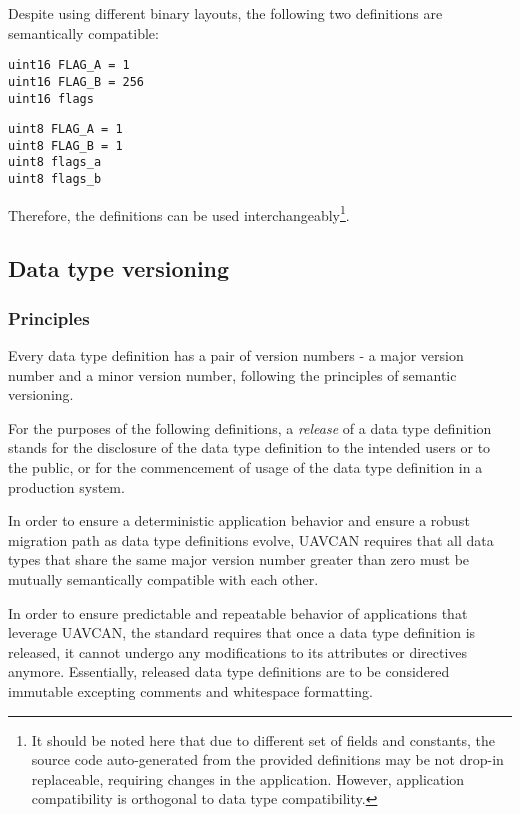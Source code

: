 Despite using different binary layouts, the following two definitions are semantically compatible:

\begin{verbatim}
uint16 FLAG_A = 1
uint16 FLAG_B = 256
uint16 flags
\end{verbatim}

\begin{verbatim}
uint8 FLAG_A = 1
uint8 FLAG_B = 1
uint8 flags_a
uint8 flags_b
\end{verbatim}

Therefore, the definitions can be used
interchangeably\footnote{It should be noted here that due to different set of fields and constants,
the source code auto-generated from the provided definitions may be not drop-in replaceable,
requiring changes in the application. However, application compatibility is orthogonal to
data type compatibility.}.

\subsection{Data type versioning}

\subsubsection{Principles}

Every data type definition has a pair of version numbers -
a major version number and a minor version number, following the principles of semantic versioning.

For the purposes of the following definitions, a \emph{release} of a data type definition stands for
the disclosure of the data type definition to the intended users or to the public,
or for the commencement of usage of the data type definition in a production system.

In order to ensure a deterministic application behavior and ensure a robust migration path
as data type definitions evolve, UAVCAN requires that all data types that share the same major version number
greater than zero must be mutually semantically compatible with each other.

In order to ensure predictable and repeatable behavior of applications that leverage UAVCAN,
the standard requires that once a data type definition is released, it cannot undergo any modifications to
its attributes or directives anymore.
Essentially, released data type definitions are to be considered immutable excepting
comments and whitespace formatting.

